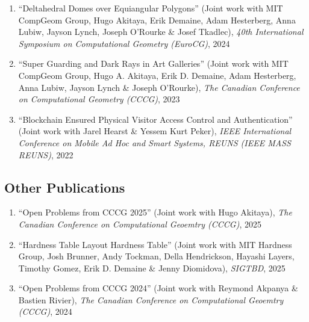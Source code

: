 \documentclass[letterpaper,11pt]{article}
\makeatletter
\newcommand{\resumeSubHeadingListStart}{\begin{itemize}[leftmargin=*]}
\newcommand{\resumeSubHeadingListEnd}{\end{itemize}}
\newcommand{\publication}[6]{
  \item ``#1'' %
   (Joint work with#2), %
     \emph{#3}, %
      #4%


}
\newcommand{\pdficon}{\faFilePdf}
\newcommand{\doilabel}{\texttt{DOI}}
\makeatother
\begin{document}
\begin{enumerate}
        \publication
          {Deltahedral Domes over Equiangular Polygons}
          {
 MIT CompGeom Group, Hugo Akitaya, Erik Demaine, Adam Hesterberg, Anna Lubiw, Jayson Lynch, Joseph O'Rourke \& Josef Tkadlec}
          {40th International Symposium on Computational Geometry (EuroCG)}
          {2024}
          {%
\href{tba/docstore/Domes-Over-Polygons-EuroCG.pdf}{\pdficon}%
%
\quad\href{https://doi.org/10.48550/arXiv.2408.04687}{\doilabel}%
          }
          {11}
 \vspace{-.5em}  
      
        \publication
          {Super Guarding and Dark Rays in Art Galleries}
          {
 MIT CompGeom Group, Hugo A. Akitaya, Erik D. Demaine, Adam Hesterberg, Anna Lubiw, Jayson Lynch \& Joseph O'Rourke}
          {The Canadian Conference on Computational Geometry (CCCG)}
          {2023}
          {%
\href{tba/docstore/DarkRaysAG-CCCG.pdf}{\pdficon}%
%
%
          }
          {12}
 \vspace{-.5em}  
      
        \publication
          {Blockchain Ensured Physical Visitor Access Control and Authentication}
          {
 Jarel Hearst \& Yessem Kurt Peker}
          {IEEE International Conference on Mobile Ad Hoc and Smart Systems, REUNS (IEEE MASS REUNS)}
          {2022}
          {%
\href{tba/docstore/blockchain-accesscontrol-REUNS.pdf}{\pdficon}%
%
%
          }
          {13}
 
    \setcounter{pubnum}{\value{enumi}}
    \end{enumerate}
    \subsection*{Other Publications}%
  
    \begin{enumerate}
    \setcounter{enumi}{\value{pubnum}}
      
        \publication
          {Open Problems from CCCG 2025}
          {
 Hugo Akitaya}
          {The Canadian Conference on Computational Geoemtry (CCCG)}
          {2025}
          {%
\href{tba/docstore/}{\pdficon}%
%
%
          }
          {1}
 \vspace{-.5em}  
      
        \publication
          {Hardness Table Layout Hardness Table}
          {
 MIT Hardness Group, Josh Brunner, Andy Tockman, Della Hendrickson, Hayashi Layers, Timothy Gomez, Erik D. Demaine \& Jenny Diomidova}
          {SIGTBD}
          {2025}
          {%
\href{tba/docstore/hardness-table-layout-SIGTBD.pdf}{\pdficon}%
%
%
          }
          {2}
 \vspace{-.5em}  
      
        \publication
          {Open Problems from CCCG 2024}
          {
 Reymond Akpanya \& Bastien Rivier}
          {The Canadian Conference on Computational Geoemtry (CCCG)}
          {2024}
          {%
\href{tba/docstore/CCCG_Open_Problems-2024.pdf}{\pdficon}%
%
%
          }
          {3}
 
    \setcounter{pubnum}{\value{enumi}}
    \end{enumerate}
\end{document}
